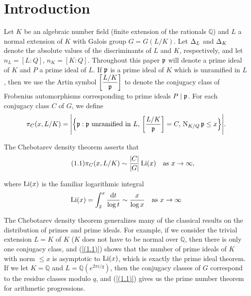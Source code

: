 \documentclass[./main]{subfiles}
\begin{document}
\section{Introduction}

Let $K$ be an algebraic number field (finite extension of the rationals $\mathbb Q$) and $L$ a normal extension of $K$ with Galois group $G = G(L/K)$. Let $\Delta_L$ and $\Delta_K$ denote the absolute values of the discriminants of $L$ and $K$, respectively, and let $n_L = [L:Q]$, $n_K = [K:Q]$. Throughout this paper $\mathfrak{p}$ will denote a prime ideal of $K$ and $P$ a prime ideal of $L$. If $\mathfrak{p}$ is a prime ideal of $K$ which is unramified in $L$, then we use the Artin symbol $\bigg[\dfrac{L/K}{\mathfrak p}\bigg]$ to denote the conjugacy class of Frobenius automorphisms corresponding to prime ideals $P\mid \mathfrak{p}$. For each conjugacy class $C$ of $G$, we define
\[ \pi_C (x, L/K) = \Bigg\vert \Big\{\mathfrak{p} : \mathfrak{p} \text{ unramified in } L,\, \bigg[\dfrac{L/K}{\mathfrak{p}}\bigg] = C,\, \operatorname{N}_{K/Q}\mathfrak{p} \le x \Big\} \Bigg\vert. \]

The Chebotarev density theorem \cite{15-Tschebotareff1926} asserts that
\[\tag{1.1}\label{(1.1)} \pi_C (x, L/K) \sim \frac{|C|}{|G|} \operatorname{Li}(x) \hspace{1em} \text{as } x\to\infty, \]

where $\operatorname{Li}(x)$ is the familiar logarithmic integral
\[ \operatorname{Li}(x) = \int_2^x \frac{\mathrm{d} t}{\log t} \sim \frac{x}{\log x} \hspace{1em}\text{as }x\to\infty \]

The Chebotarev density theorem generalizes many of the classical results on the distribution of primes and prime ideals. For example, if we consider the trivial extension $L = K$ of $K$ ($K$ does not have to be normal over $\mathbb Q$, then there is only one conjugacy class, and (\ref{(1.1)}) shows that the number of prime ideals of $K$ with norm $\le x$ is asymptotic to $\operatorname{Li}(x)$, which is exactly the prime ideal theorem. If we let $K = \mathbb Q$ and $L = \mathbb Q(e^{2\pi i/q})$, then the conjugacy classes of $G$ correspond to the residue classes modulo $q$, and (\ref{(1.1)}) gives us the prime number theorem for arithmetic progressions.
\end{document}
